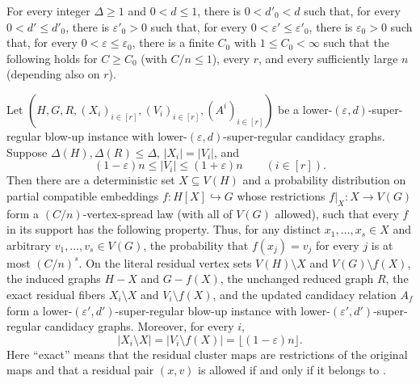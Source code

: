 \begin{lemma}
For every integer $\Delta\geq1$ and $0<d\leq1$, there is $0<d'_0<d$ such that, for every $0<d'\leq d'_0$, there is $\varepsilon'_0>0$ such that, for every $0<\varepsilon'\leq\varepsilon'_0$, there is $\varepsilon_0>0$ such that, for every $0<\varepsilon\leq\varepsilon_0$, there is a finite $C_0$ with $1\leq C_0<\infty$ such that the following holds for $C\geq C_0$ (with $C/n\leq1$), every $r$, and every sufficiently large $n$ (depending also on $r$).

Let $(H,G,R,(X_i)_{i\in[r]},(V_i)_{i\in[r]},(A^i)_{i\in[r]})$ be a lower-$(\varepsilon,d)$-super-regular blow-up instance with lower-$(\varepsilon,d)$-super-regular candidacy graphs.  Suppose $\Delta(H),\Delta(R)\leq\Delta$, $|X_i|=|V_i|$, and
\[
 (1-\varepsilon)n\leq |V_i|\leq(1+\varepsilon)n
 \qquad(i\in[r]).
\]
Then there are a deterministic set $X\subseteq V(H)$ and a probability distribution on partial compatible embeddings $f:H[X]\hookrightarrow G$ whose restrictions $f|_X:X\to V(G)$ form a $(C/n)$-vertex-spread law (with all of $V(G)$ allowed), such that every $f$ in its support has the following property.  Thus, for any distinct $x_1,\ldots,x_s\in X$ and arbitrary $v_1,\ldots,v_s\in V(G)$, the probability that $f(x_j)=v_j$ for every $j$ is at most $(C/n)^s$.  On the literal residual vertex sets $V(H)\setminus X$ and $V(G)\setminus f(X)$, the induced graphs $H-X$ and $G-f(X)$, the unchanged reduced graph $R$, the exact residual fibers $X_i\setminus X$ and $V_i\setminus f(X)$, and the updated candidacy relation $A_f$ form a lower-$(\varepsilon',d')$-super-regular blow-up instance with lower-$(\varepsilon',d')$-super-regular candidacy graphs.  Moreover, for every $i$,
\[
 |X_i\setminus X|=|V_i\setminus f(X)|=\lfloor(1-\varepsilon)n\rfloor.
\]
Here ``exact'' means that the residual cluster maps are restrictions of the original maps and that a residual pair $(x,v)$ is allowed if and only if it belongs to .
\end{lemma}
